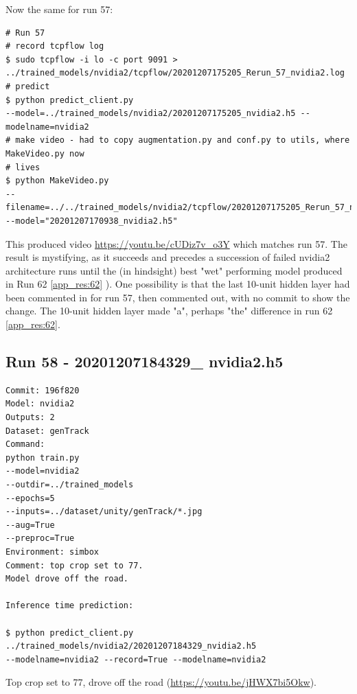 Now the same for run 57:
\begin{verbatim}
# Run 57
# record tcpflow log
$ sudo tcpflow -i lo -c port 9091 >
../trained_models/nvidia2/tcpflow/20201207175205_Rerun_57_nvidia2.log
# predict
$ python predict_client.py 
--model=../trained_models/nvidia2/20201207175205_nvidia2.h5 --modelname=nvidia2
# make video - had to copy augmentation.py and conf.py to utils, where MakeVideo.py now
# lives
$ python MakeVideo.py 
--filename=../../trained_models/nvidia2/tcpflow/20201207175205_Rerun_57_nvidia2.log
--model="20201207170938_nvidia2.h5"
\end{verbatim}
This produced video \url{https://youtu.be/cUDiz7v_o3Y} which matches run 57. The result is
mystifying, as it succeeds and precedes a succession of failed nvidia2 architecture runs until the (in hindsight) best "wet" performing model produced in Run 62 \ref{app_res:62} ). One possibility is that the
last 10-unit hidden layer had been commented in for run 57, then commented out, with no commit to show the change. The 10-unit hidden layer made "a", perhaps "the" difference in run 62 \ref{app_res:62}.
\subsection{Run 58 - 20201207184329\_ nvidia2.h5}
\label{app_res:58}
\begin{verbatim}
Commit: 196f820
Model: nvidia2
Outputs: 2
Dataset: genTrack
Command:
python train.py 
--model=nvidia2
--outdir=../trained_models
--epochs=5
--inputs=../dataset/unity/genTrack/*.jpg
--aug=True
--preproc=True
Environment: simbox
Comment: top crop set to 77. 
Model drove off the road.

Inference time prediction:

$ python predict_client.py ../trained_models/nvidia2/20201207184329_nvidia2.h5
--modelname=nvidia2 --record=True --modelname=nvidia2
\end{verbatim}

Top crop set to 77, drove off the road (\url{https://youtu.be/jHWX7bi5Okw}).

